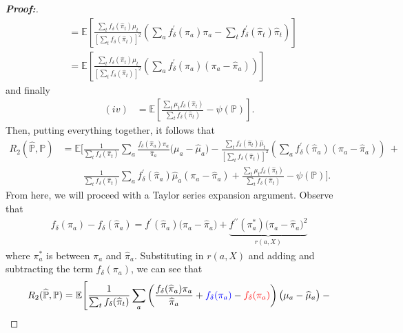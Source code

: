 \documentclass[11pt,twoside]{article}
\theoremstyle{definition}
\theoremstyle{remark}
\begin{document}
\begin{proof}[\textbf{Proof:}]
\begin{align*}
    &= \mathbb{E} \left[\frac{\sum_t f_\delta( \widehat{\pi}_t) \widehat{\mu}_t}{\left[\sum_t f_\delta(\widehat{\pi}_t) \right]^2} \left( \sum_a f^\prime_\delta( \widehat{\pi}_a) \pi_a  - \sum_t f^\prime_\delta( \widehat{\pi}_t) \widehat{\pi}_t \right) \right] \\
    &= \mathbb{E} \left[\frac{\sum_t f_\delta( \widehat{\pi}_t) \widehat{\mu}_t}{\left[\sum_t f_\delta(\widehat{\pi}_t) \right]^2} \left( \sum_a f^\prime_\delta( \widehat{\pi}_a) (\pi_a - \widehat{\pi}_a) \right) \right]
\end{align*}
and finally
\begin{align*}
    (iv) &= \mathbb{E}\left[\frac{\sum_t  \mu_t f_\delta(\widehat{\pi}_t )}{\sum_t f_\delta(\widehat{\pi}_t)} - \psi(\mathbb{P}) \right].
\end{align*}
Then, putting everything together, it follows that
\begin{align*}
    R_2(\widehat{\mathbb{P}}, \mathbb{P}) &= \mathbb{E}\Bigg[ \frac{1}{\sum_t f_\delta(\widehat{\pi}_t)} \sum_a   \frac{f_\delta(\widehat{\pi}_a) \pi_a}{\widehat{\pi}_a }\Big(\mu_a - \widehat{\mu}_a \Big) - \frac{\sum_t f_\delta( \widehat{\pi}_t) \widehat{\mu}_t}{\left[\sum_t f_\delta(\widehat{\pi}_t) \right]^2} \left( \sum_a f^\prime_\delta( \widehat{\pi}_a) (\pi_a - \widehat{\pi}_a) \right) \: + \\
    &\phantom{{}={\mathbb{E}\Bigg[}}  \frac{1}{\sum_t f_\delta(\widehat{\pi}_t)}\sum_a  f^{\prime}_\delta(\widehat{\pi}_a) \widehat{\mu}_a (\pi_a -  \widehat{\pi}_a) + \frac{\sum_t  \mu_t f_\delta(\widehat{\pi}_t )}{\sum_t f_\delta(\widehat{\pi}_t)} - \psi(\mathbb{P}) \Bigg].
\end{align*}
From here, we will proceed with a Taylor series expansion argument. Observe that
\begin{align*}
    f_\delta(\pi_a) - f_\delta(\widehat{\pi}_a) = f^\prime (\widehat{\pi}_a) \big(\pi_a - \widehat{\pi}_a \big) + \underbrace{f^{\prime \prime} (\pi^*_a) \big(\pi_a - \widehat{\pi}_a \big)^2}_{r(a, X)}
\end{align*}
where $\pi^*_a$ is between $\pi_a$ and $\widehat{\pi}_a$. Substituting in $r(a, X)$ and adding and subtracting the term $f_\delta(\pi_a)$, we can see that
\begin{align*}
    R_2(\widehat{\mathbb{P}}, \mathbb{P}) &= \mathbb{E}\Bigg[ \frac{1}{\sum_t f_\delta(\widehat{\pi}_t)} \sum_a \left(\frac{f_\delta(\widehat{\pi}_a) \pi_a}{\widehat{\pi}_a} + \textcolor{blue}{f_\delta(\pi_a)} - \textcolor{red}{f_\delta(\pi_a)} \right)\big(\mu_a - \widehat{\mu}_a \big) \: - \\

\end{align*}
\end{proof}
\end{document}
